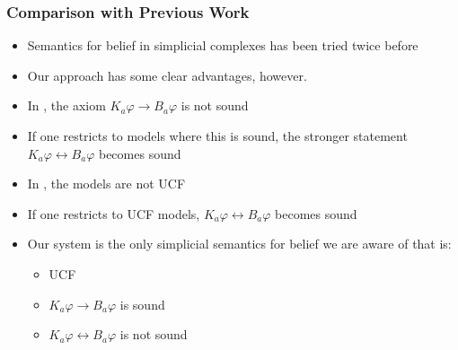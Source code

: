 \documentclass{beamer}
\begin{document}
	\begin{frame}[fragile]
		\frametitle{Comparison with Previous Work}
		\begin{itemize}
			\item Semantics for belief in simplicial complexes has been tried twice before \cite{KaSC,SimpBel}
			\item Our approach has some clear advantages, however.
			\item In \cite{KaSC}, the axiom $K_a\varphi\rightarrow B_a\varphi$ is not sound
			\item If one restricts to models where this is sound, the stronger statement $K_a\varphi\leftrightarrow B_a\varphi$ becomes sound
			\item In \cite{SimpBel}, the models are not UCF
			\item If one restricts to UCF models, $K_a\varphi\leftrightarrow B_a\varphi$ becomes sound
			\item Our system is the only simplicial semantics for belief we are aware of that is:
			\begin{itemize}
				\item UCF
				\item $K_a\varphi\rightarrow B_a\varphi$ is sound
				\item $K_a\varphi\leftrightarrow B_a\varphi$ is not sound
			\end{itemize}
		\end{itemize}
	\end{frame}
	
\end{document}
